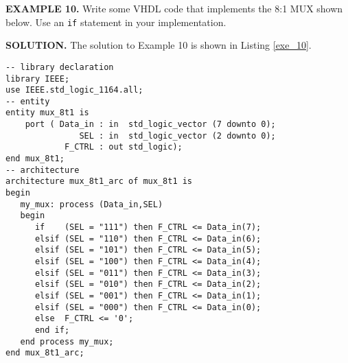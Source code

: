 \begin{leftbar}
\noindent
\begin{minipage}{0.45\linewidth}
\textbf{EXAMPLE 10.}
Write some VHDL code that implements the 8:1 MUX shown below. Use an \texttt{if} statement in your implementation.\\
\end{minipage}
\begin{minipage}{0.5\linewidth}
\begin{flushright}
\end{flushright}
\end{minipage}

\end{leftbar}
\noindent
\textbf{SOLUTION.} The solution to Example 10 is shown in Listing \ref{exe_10}.

\noindent
\begin{minipage}{0.99\linewidth}
\begin{lstlisting}[label=exe_10, caption=Solution to Example 10.]
-- library declaration
library IEEE;
use IEEE.std_logic_1164.all;
-- entity
entity mux_8t1 is
    port ( Data_in : in  std_logic_vector (7 downto 0);
               SEL : in  std_logic_vector (2 downto 0);
            F_CTRL : out std_logic);  
end mux_8t1;
-- architecture
architecture mux_8t1_arc of mux_8t1 is 
begin
   my_mux: process (Data_in,SEL)
   begin
      if    (SEL = "111") then F_CTRL <= Data_in(7); 
      elsif (SEL = "110") then F_CTRL <= Data_in(6); 
      elsif (SEL = "101") then F_CTRL <= Data_in(5); 
      elsif (SEL = "100") then F_CTRL <= Data_in(4); 
      elsif (SEL = "011") then F_CTRL <= Data_in(3); 
      elsif (SEL = "010") then F_CTRL <= Data_in(2); 
      elsif (SEL = "001") then F_CTRL <= Data_in(1); 
      elsif (SEL = "000") then F_CTRL <= Data_in(0); 
      else  F_CTRL <= '0'; 
      end if;    
   end process my_mux; 
end mux_8t1_arc; 
\end{lstlisting}
\end{minipage}

